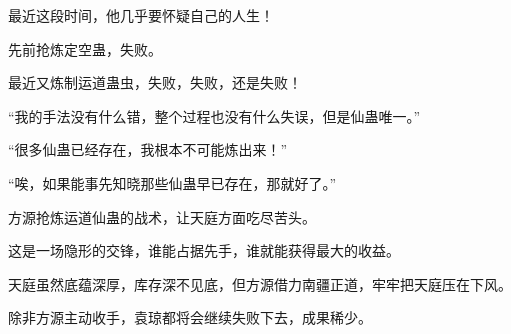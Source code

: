 \begin{this_body}
最近这段时间，他几乎要怀疑自己的人生！

先前抢炼定空蛊，失败。

最近又炼制运道蛊虫，失败，失败，还是失败！

“我的手法没有什么错，整个过程也没有什么失误，但是仙蛊唯一。”

“很多仙蛊已经存在，我根本不可能炼出来！”

“唉，如果能事先知晓那些仙蛊早已存在，那就好了。”

方源抢炼运道仙蛊的战术，让天庭方面吃尽苦头。

这是一场隐形的交锋，谁能占据先手，谁就能获得最大的收益。

天庭虽然底蕴深厚，库存深不见底，但方源借力南疆正道，牢牢把天庭压在下风。

除非方源主动收手，袁琼都将会继续失败下去，成果稀少。

\end{this_body}

